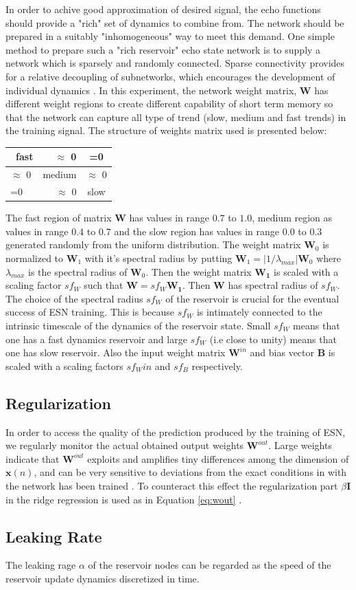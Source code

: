 In order to achive good approximation of desired signal, the echo functions should provide a "rich" set of dynamics to combine from. The network should be prepared in a suitably "inhomogeneous" way to meet this demand. One simple method to prepare such a "rich reservoir" echo state network is to supply a network which is sparsely and randomly connected. Sparse connectivity provides for a relative decoupling of subnetworks, which encourages the development of individual dynamics \cite{shortTermMemory}. In this experiment, the network weight matrix, $\mathbf{W}$ has different weight regions to create different capability of short term memory so that the network can capture all type of trend (slow, medium and fast trends) in the training signal. The structure of weights matrix used is presented below:\\
      \begin{center}
	  \begin{tabular}{|l|r|c|}\hline
		  \
		  fast & $\approx$ 0 & =0 \\[5ex] \hline
		  $\approx$ 0 & medium & $\approx$ 0 \\[5ex] \hline
		  =0 & $\approx$ 0 & slow \\[5ex] \hline 
	  \end{tabular}	  
	  \end{center}
The fast region of matrix $\mathbf{W}$ has values in range $0.7$ to $1.0$, medium region as values in range $0.4$ to  $0.7$ and the slow region has values in range $0.0$ to $0.3$ generated randomly from the uniform distribution.  The weight matrix $\mathbf{W}_0$ is normalized to  $\mathbf{W}_1$ with it's spectral radius  by putting $\mathbf{W}_1 = \left| 1/\lambda _{max}\right| \mathbf{W}_0$ where $\lambda _{max}$ is the spectral radius of $\mathbf{W}_0$. Then the weight matrix $\mathbf{W_1}$ is scaled with a scaling factor $sf_W$ such that $\mathbf{W} = sf_W \mathbf{W_1}$. Then $\mathbf{W}$ has spectral radius of $sf_W$. The choice of the spectral radius $sf_W$ of the reservoir is crucial for the eventual success of ESN training. This is because $sf_W$ is  intimately connected to the intrinsic timescale of the dynamics of the reservoir state. Small $sf_W$ means that one has a fast dynamics reservoir and large $sf_W$ (i.e close to unity) means that one has slow reservoir. Also the input weight matrix $\mathbf{W}^{in}$  and bias vector $\mathbf{B}$ is scaled with a scaling factors $sf_Win$ and $sf_B$ respectively. 

\subsection{Regularization}
In order to access the quality of the prediction produced by the training of ESN, we regularly monitor the actual obtained output weights $\mathbf{W}^{out}$. Large weights indicate that $\mathbf{W}^{out}$ exploits and amplifies tiny differences among the dimension of  $\mathbf{x}(n)$, and can be very sensitive to deviations from the exact conditions in with the network has been trained \cite{mantas}. To counteract this effect the regularization part $\beta \mathbf{I}$ in the ridge regression is used as in Equation  \eqref{eq:wout} .

\subsection{Leaking Rate}

The leaking rage $\alpha$ of the reservoir nodes can be regarded as the speed of the reservoir update dynamics discretized in time. 
